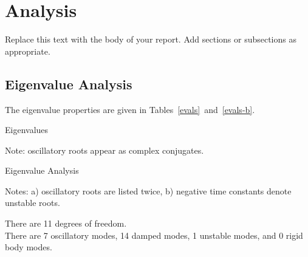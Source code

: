 \chapter{Analysis}
Replace this text with the body of your report.  Add sections or subsections as appropriate.
\section{Eigenvalue Analysis}
The eigenvalue properties are given in Tables~\ref{evals}~and~\ref{evals-b}.

\begin{table}[ht]
\begin{center}
\begin{threeparttable}
\begin{footnotesize}
\caption{Eigenvalues}
\label{evals}
\begin{tablenotes}
\item Note: oscillatory roots appear as complex conjugates.
\end{tablenotes}
\end{footnotesize}
\end{threeparttable}
\end{center}
\end{table}
\begin{table}[ht]
\begin{center}
\begin{threeparttable}
\begin{footnotesize}
\caption{Eigenvalue Analysis}
\label{evals-b}
\begin{tablenotes}
\item Notes: a) oscillatory roots are listed twice, b) negative time constants denote unstable roots.
\end{tablenotes}
\end{footnotesize}
\end{threeparttable}
\end{center}
\end{table}
There are 11 degrees of freedom.\\

There are 7 oscillatory modes, 14 damped modes, 1 unstable modes, and 0 rigid body modes.
\pagebreak

